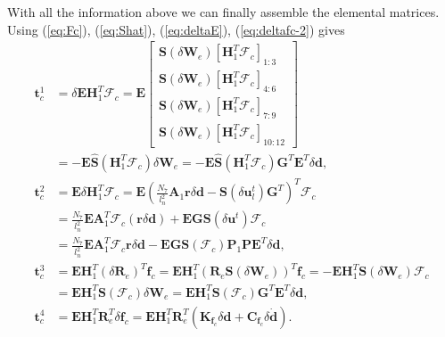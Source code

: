 \documentclass[3p]{elsarticle}
\newcommand{\vect}[1]{\boldsymbol{#1}}
\begin{document}
\noindent With all the information above we can finally assemble the elemental matrices. Using (\ref{eq:Fc}), (\ref{eq:Shat}), (\ref{eq:deltaE}), (\ref{eq:deltafc-2}) gives
\begin{subequations}
	\begin{align}
		\vect{t}_c^1&=\delta\vect{E}\vect{H}^T_1\vect{\mathcal{F}}_c=  \vect{E}\left[\begin{array}{c}
			\vect{S}(\delta\vect{W}_e)\left[\vect{H}^T_1\vect{\mathcal{F}}_c\right]_{1:3} \\
			\vect{S}(\delta\vect{W}_e)\left[\vect{H}^T_1\vect{\mathcal{F}}_c\right]_{4:6} \\
			\vect{S}(\delta\vect{W}_e)\left[\vect{H}^T_1\vect{\mathcal{F}}_c\right]_{7:9}\\
			\vect{S}(\delta\vect{W}_e)\left[\vect{H}^T_1\vect{\mathcal{F}}_c\right]_{10:12}
		\end{array}\right]\nonumber\\
		&=  -\vect{E}\hat{\vect{S}}(\vect{H}^T_1\vect{\mathcal{F}}_c)\delta\vect{W}_e= -\vect{E}\hat{\vect{S}}(\vect{H}^T_1\vect{\mathcal{F}}_c)\vect{G}^T\vect{E}^T\delta\vect{d},\label{eq:tc1}\\
		\vect{t}_c^2&=\vect{E}\delta\vect{H}_1^T\vect{\mathcal{F}}_c=\vect{E}\left(\frac{N_7}{l_n^2}\vect{A}_1\vect{r}\delta\vect{d}-\vect{S}(\delta\vect{u}_l^t)\vect{G}^T\right)^T\vect{\mathcal{F}}_c\nonumber\\ &=\frac{N_7}{l_n^2}\vect{E}\vect{A}_1^T\vect{\mathcal{F}}_c\left(\vect{r}\delta\vect{d}\right)+\vect{E}\vect{G}\vect{S}(\delta\vect{u}^t)\vect{\mathcal{F}}_c\nonumber\\
		&= \frac{N_7}{l_n^2}\vect{E}\vect{A}_1^T\vect{\mathcal{F}}_c\vect{r}\delta\vect{d}-\vect{E}\vect{G}\vect{S}(\vect{\mathcal{F}}_c)\vect{P}_1\vect{P}\vect{E}^T\delta\vect{d},\label{eq:tc2}\\
		\vect{t}_c^3&=\vect{E}\vect{H}_1^T(\delta\vect{R}_e)^T\vect{f}_c= \vect{E}\vect{H}_1^T\left(\vect{R}_e\vect{S}(\delta\vect{W}_e)\right)^T\vect{f}_c= -\vect{E}\vect{H}_1^T\vect{S}(\delta\vect{W}_e)\vect{\mathcal{F}}_c\nonumber\label{eq:tc3}\\
		&= \vect{E}\vect{H}_1^T\vect{S}(\vect{\mathcal{F}}_c)\delta\vect{W}_e=\vect{E}\vect{H}_1^T\vect{S}(\vect{\mathcal{F}}_c)\vect{G}^T\vect{E}^T\delta\vect{d},\\
		\vect{t}_c^4&=\vect{E}\vect{H}_1^T\vect{R}_e^T\delta\vect{f}_c=\vect{E}\vect{H}_1^T\vect{R}_e^T\left(\vect{K}_{\vect{f}_c}\delta\vect{d}+\vect{C}_{\vect{f}_c}\delta\dot{\vect{d}}\right).\label{eq:tc4}
	\end{align}\label{eq:tci}
\end{subequations}
\end{document}
